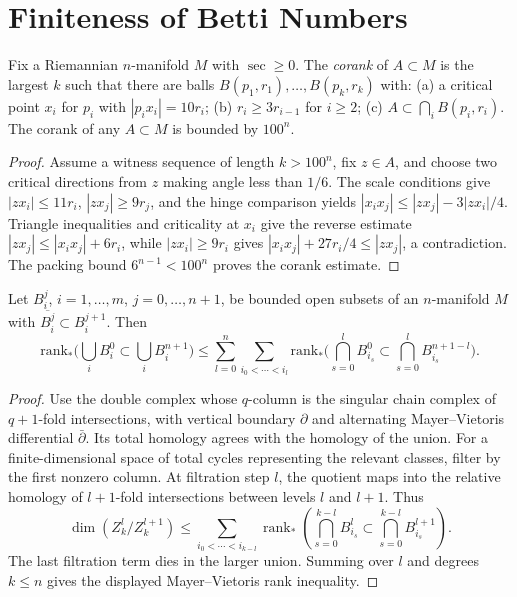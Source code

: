 \section{Finiteness of Betti Numbers}

\begin{lemma}
  \label{lem:pet-ch12-corank-bound}
  Fix a Riemannian $n$-manifold $M$ with $\sec\ge0$. The \emph{corank} of
  $A\subset M$ is the largest $k$ such that there are balls
  $B(p_1,r_1),\dots,B(p_k,r_k)$ with: (a) a critical point $x_i$ for $p_i$ with
  $|p_ix_i|=10r_i$; (b) $r_i\ge3r_{i-1}$ for $i\ge2$; (c)
  $A\subset\bigcap_iB(p_i,r_i)$. The corank of any $A\subset M$ is bounded by
  $100^n$.
\end{lemma}
\begin{proof}
  \sketch
  Assume a witness sequence of length \(k>100^n\), fix \(z\in A\), and choose
  two critical directions from \(z\) making angle less than \(1/6\). The scale
  conditions give \( |zx_i|\le11r_i\), \( |zx_j|\ge9r_j\), and the hinge
  comparison yields \( |x_ix_j|\le|zx_j|-3|zx_i|/4\). Triangle inequalities
  and criticality at \(x_i\) give the reverse estimate
  \( |zx_j|\le|x_ix_j|+6r_i\), while \( |zx_i|\ge9r_i\) gives
  \( |x_ix_j|+27r_i/4\le|zx_j|\), a contradiction. The packing bound
  \(6^{n-1}<100^n\) proves the corank estimate.
\end{proof}

\begin{lemma}
  \label{lem:pet-ch12-mayer-vietoris-rank}
  Let $B_i^j$, $i=1,\dots,m$, $j=0,\dots,n+1$, be bounded open subsets of an
  $n$-manifold $M$ with $\overline{B_i^j}\subset B_i^{j+1}$. Then
  \[
    \mathrm{rank}_*\Big(\bigcup_iB_i^0\subset\bigcup_iB_i^{n+1}\Big)
    \le\sum_{l=0}^{n}\sum_{i_0<\cdots<i_l}
    \mathrm{rank}_*\Big(\bigcap_{s=0}^lB_{i_s}^0\subset\bigcap_{s=0}^lB_{i_s}^{n+1-l}\Big).
  \]
\end{lemma}
\begin{proof}
  \sketch
  Use the double complex whose \(q\)-column is the singular chain complex
  of \(q+1\)-fold intersections, with vertical boundary \(\partial\) and
  alternating Mayer--Vietoris differential \(\bar\partial\). Its total
  homology agrees with the homology of the union. For a finite-dimensional
  space of total cycles representing the relevant classes, filter by the first
  nonzero column. At filtration step \(l\), the quotient maps into the
  relative homology of \(l+1\)-fold intersections between levels \(l\) and
  \(l+1\). Thus
  \[\dim(Z_k^l/Z_k^{l+1})\le\sum_{i_0<\cdots<i_{k-l}}
  \operatorname{rank}_*\left(\bigcap_{s=0}^{k-l} B_{i_s}^{l}\subset
    \bigcap_{s=0}^{k-l} B_{i_s}^{l+1}\right).\]
  The last filtration term dies in the larger union. Summing over \(l\) and
  degrees \(k\le n\) gives the displayed Mayer--Vietoris rank inequality.
\end{proof}

